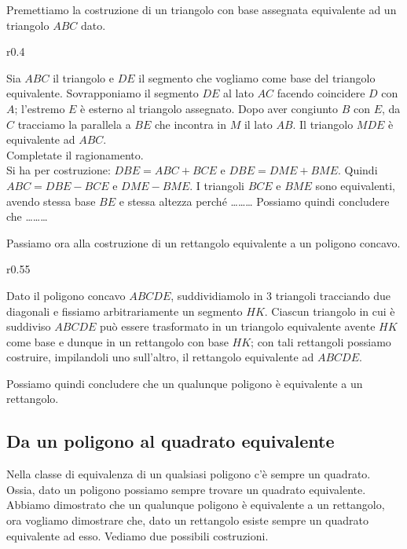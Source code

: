 Premettiamo la costruzione di un triangolo con base assegnata 
equivalente ad un triangolo \(ABC\) dato.

\begin{wrapfigure}{r}{0.4\textwidth}
	\centering
\end{wrapfigure}
Sia \(ABC\) il triangolo e \(DE\) il segmento che vogliamo come base del 
triangolo equivalente.
Sovrapponiamo il segmento \(DE\) al lato \(AC\) facendo coincidere \(D\) 
con \(A\); l'estremo \(E\) è esterno al triangolo assegnato. Dopo aver 
congiunto \(B\) con \(E\), da \(C\) tracciamo la parallela a \(BE\) che 
incontra in \(M\) il lato \(AB\). Il triangolo \(MDE\) è equivalente ad 
\(ABC\).\\
Completate il ragionamento.\\
Si ha per costruzione: 
\(DBE=ABC+BCE\) e \(DBE=DME+BME\).
Quindi \(ABC=DBE-BCE\) e \(DME-BME\).
I triangoli \(BCE\) e \(BME\) sono equivalenti, avendo stessa base \(BE\) e 
stessa altezza perché \ldots\ldots\ldots{}	Possiamo quindi 
concludere che \ldots\ldots\ldots{}

Passiamo ora alla costruzione di un rettangolo equivalente a un 
poligono concavo.

\begin{wrapfigure}{r}{0.55\textwidth}
	\centering
\end{wrapfigure}
Dato il poligono concavo \(ABCDE\), suddividiamolo in 3 triangoli 
tracciando due diagonali e fissiamo arbitrariamente un segmento \(HK\). 
Ciascun triangolo in cui è suddiviso \(ABCDE\) può essere trasformato 
in un triangolo equivalente avente \(HK\) come base e dunque in un 
rettangolo con base \(HK\); con tali rettangoli possiamo costruire, 
impilandoli uno sull'altro, il rettangolo equivalente ad \(ABCDE\).

Possiamo quindi concludere che un qualunque poligono è equivalente a 
un rettangolo.

\subsection{Da un poligono al quadrato equivalente}

Nella classe di equivalenza di un qualsiasi poligono c'è sempre un 
quadrato. Ossia, dato un poligono possiamo sempre trovare un quadrato 
equivalente.
Abbiamo dimostrato che un qualunque poligono è equivalente a un 
rettangolo, ora vogliamo dimostrare che, dato un rettangolo esiste 
sempre un quadrato equivalente ad esso.
Vediamo due possibili costruzioni.

